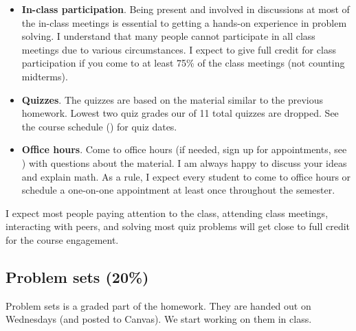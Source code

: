 \documentclass[oneside,11pt]{amsart}
\begin{document}
\begin{itemize}
	\item \textbf{In-class participation}. 
		Being present and involved in discussions at most of the in-class meetings
		is essential to getting a hands-on experience 
		in problem solving. 
		I understand that many people cannot participate in all class meetings due to various
		circumstances. 
		I expect to give full credit for class participation 
		if you come to at least 75\% of the class meetings (not counting midterms).
	\item \textbf{Quizzes}. 
		The quizzes are based on the material similar to the previous homework.
		Lowest two quiz grades our of 11 total quizzes are dropped.
		See the course schedule () for quiz dates.
	\item \textbf{Office hours}. Come to office hours (if needed, 
		sign up for appointments, see ) 
		with questions about the material.
		I am always happy to discuss your ideas and explain math.
		As a rule, I expect every student to come to office hours or schedule a one-on-one appointment
		at least once throughout the semester.
\end{itemize}

I expect most people paying attention to the class, attending class meetings, interacting with peers, and solving most quiz problems will get close to full credit for the course engagement.

\subsection{Problem sets (20\%)}

Problem sets is a graded part of the homework. They are handed out on Wednesdays (and posted to Canvas).
We start working on them in class.

\medskip
\end{document}
